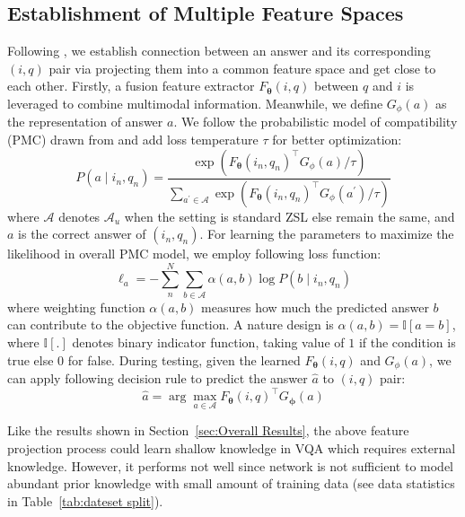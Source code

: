 \documentclass[runningheads]{llncs}
\begin{document}
\subsection{Establishment of Multiple Feature Spaces} \label{sec:feature Spaces}
Following \cite{DBLP:conf/cvpr/HuCS18}, we establish connection between an answer and its corresponding $(i, q)$ pair via projecting them into a common feature space and get close to each other.
Firstly, a fusion feature extractor $F_{\boldsymbol{\theta}}\left(i, q\right)$ between $q$ and $i$ is leveraged to combine multimodal information.
Meanwhile, we define  $G_{\phi} (a)$
as the representation of answer $a$.
We follow the probabilistic model of compatibility (PMC) drawn from \cite{DBLP:conf/cvpr/HuCS18} and add loss temperature $\tau$ for better optimization:
\begin{equation}
	P\left(a \mid i_{n}, q_{n}\right)=\frac{\exp \left(F_{\boldsymbol{\theta}}\left(i_{n}, q_{n}\right)^{\top} G_{\phi}(a)/\tau\right)}{\sum_{a^{\prime} \in \mathcal{A}} \exp \left(F_{\boldsymbol{\theta}}\left(i_{n}, q_{n}\right)^{\top} G_{\phi}\left(a^{\prime}\right)/\tau\right)}
\end{equation}
where $\mathcal{A}$ denotes $\mathcal{A}_{u}$ when the setting is standard ZSL else remain the same, and $a$ is the correct answer of $(i_n,q_n)$.
For learning the parameters to maximize the likelihood in overall PMC model, we employ following loss function:
\begin{equation}
	\ell_{a}=-\sum_{n}^{N} \sum_{b \in \mathcal{A}} \alpha(a, b) \log P\left(b \mid i_{n}, q_{n}\right)
\end{equation}
where weighting function $\alpha(a, b)$ measures how much the predicted answer $b$ can contribute to the objective function. A nature design is
$\alpha(a, b)=\mathbb{I}[a=b]$, 
where $\mathbb{I}[.]$ denotes binary indicator function, taking value of $1$ if the condition is true else $0$ for false. 
During testing, 
given the learned $F_{\boldsymbol{\theta}}\left(i, q\right)$ and $G_{\phi}(a)$, 
we can apply following decision rule to predict the answer $\hat{a}$ to $(i, q)$ pair:
\begin{equation}
\hat{a}=\arg \max _{a \in \mathcal{A}} F_{\boldsymbol{\theta}}(i, q)^{\top} G_{\boldsymbol{\phi}}(a)	
\end{equation}

Like the results shown in Section~\ref{sec:Overall Results}, the above feature projection process could learn shallow knowledge in VQA which requires external knowledge. 
However, it performs not well since network is not sufficient to model abundant prior knowledge with small amount of training data (see data statistics in Table~\ref{tab:dateset split}).
\end{document}
